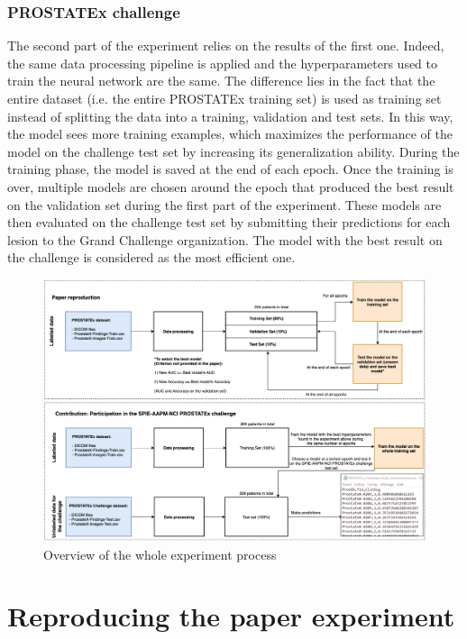 \subsubsection{PROSTATEx challenge}
The second part of the experiment relies on the results of the first one. Indeed, the same data processing pipeline is applied and the hyperparameters used to train the neural network are the same. The difference lies in the fact that the entire dataset (i.e. the entire PROSTATEx training set) is used as training set instead of splitting the data into a training, validation and test sets. In this way, the model sees more training examples, which maximizes the performance of the model on the challenge test set by increasing its generalization ability. During the training phase, the model is saved at the end of each epoch. Once the training is over, multiple models are chosen around the epoch that produced the best result on the validation set during the first part of the experiment. These models are then evaluated on the challenge test set by submitting their predictions for each lesion to the Grand Challenge organization. The model with the best result on the challenge is considered as the most efficient one.

\clearpage

\begin{figure}[!t]
\centering
\includegraphics[width=1\textwidth, keepaspectratio=true]{./figures/paper_reproduction_process.png}
\caption{Overview of the whole experiment process}
\label{fig:paper_reproduction_process}
\end{figure}

\section{Reproducing the paper experiment}

